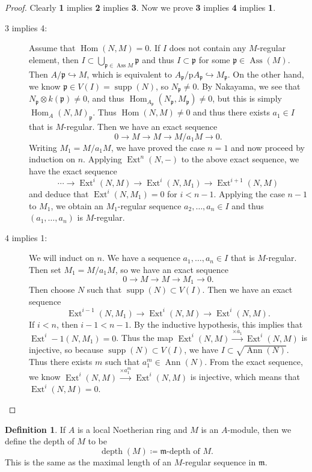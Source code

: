 \documentclass[leqno, openany]{memoir}
\theoremstyle{definition}
\newtheorem{defn}[thm]{Definition}
\theoremstyle{remark}
\theoremstyle{plain}
\theoremstyle{definition}
\theoremstyle{remark}
\newcommand{\mf}[1]{\mathfrak{#1}}
\newcommand{\mr}[1]{\mathrm{#1}}
\DeclareMathOperator{\Hom}{Hom}
\DeclareMathOperator{\supp}{supp}
\DeclareMathOperator{\Ext}{Ext}
\DeclareMathOperator{\Ann}{Ann}
\DeclareMathOperator{\Ass}{Ass}
\begin{document}
\begin{proof}
    Clearly \textbf{1} implies \textbf{2} implies \textbf{3}. Now we prove \textbf{3} implies \textbf{4} implies \textbf{1}.
    \begin{description}
        \item[3 implies 4:] Assume that $\Hom(N,M) = 0$. If $I$ does not contain any $M$-regular element, then $I \subset \bigcup_{\mf{p} \in \Ass M} \mf{p}$ and thus $I \subset \mf{p}$ for some $\mf{p} \in \Ass(M)$. Then $A/\mf{p} \hookrightarrow M$, which is equivalent to $A_{\mf{p}} / \mr{p} A_{\mf{p}} \hookrightarrow M_{\mf{p}} $. On the other hand, we know $\mf{p} \in V(I) = \supp(N)$, so $N_{\mf{p}} \neq 0$. By Nakayama, we see that $N_{\mf{p}} \otimes k(\mf{p}) \neq 0$, and thus $\Hom_{A_{\mf{p}}}(N_{\mf{p}}, M_{\mf{p}}) \neq 0$, but this is simply $\Hom_A(N,M)_{\mf{p}}$. Thus $\Hom(N,M) \neq 0$ and thus there exists $a_1 \in I$ that is $M$-regular. Then we have an exact sequence 
            \[ 0 \to M \to M \to M/a_1 M \to 0. \]
            Writing $M_1 = M/a_1 M$, we have proved the case $n=1$ and now proceed by induction on $n$. Applying $\Ext^n(N,-)$ to the above exact sequence, we have the exact sequence
            \[ \cdots \to \Ext^i(N,M) \to \Ext^i(N,M_1) \to \Ext^{i+1}(N,M) \]
            and deduce that $\Ext^i(N,M_1) = 0$ for $i < n-1$. Applying the case $n-1$ to $M_1$, we obtain an $M_1$-regular sequence $a_2, \ldots, a_n \in I$ and thus $(a_1, \ldots, a_n)$ is $M$-regular.
        \item[4 implies 1:] We will induct on $n$. We have a sequence $a_1, \ldots, a_n \in I$ that is $M$-regular. Then set $M_1 = M/a_1 M$, so we have an exact sequence
            \[ 0 \to M \to M \to M_1 \to 0. \]
            Then choose $N$ such that $\supp(N) \subset V(I)$. Then we have an exact sequence
            \[ \Ext^{i-1}(N, M_1) \to \Ext^i(N,M) \to \Ext^i(N,M). \]
            If $i < n$, then $i-1 < n-1$. By the inductive hypothesis, this implies that $\Ext^i-1(N, M_1) = 0$. Thus the map $\Ext^i(N,M) \xrightarrow{\times a_1} \Ext^i(N,M)$ is injective, so because $\supp(N) \subset V(I)$, we have $I \subset \sqrt{\Ann(N)}$. Thus there exists $m$ such that $a_1^m \in \Ann(N)$. From the exact sequence, we know $\Ext^i(N,M) \xrightarrow{\times a_1^m} \Ext^i(N,M)$ is injective, which means that $\Ext^i(N,M) = 0$. \qedhere
    \end{description}
\end{proof}

\begin{defn}
    If $A$ is a local Noetherian ring and $M$ is an $A$-module, then we define the depth of $M$ to be
    \[ \operatorname{depth}(M) \coloneqq \mf{m}\text{-depth of }M. \]
    This is the same as the maximal length of an $M$-regular sequence in $\mf{m}$.
\end{defn}
\end{document}
